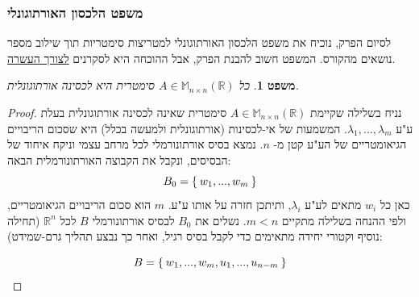 \documentclass[12pt]{report}
\theoremstyle{plain}
\newtheorem{theorem}{משפט}[chapter]
\theoremstyle{definition}
\newcommand{\R}{\mathbb{R}}
\newcommand{\M}{\mathbb{M}}
\newcommand{\0}{\mathbf{0}}
\begin{document}
\subsubsection{משפט הלכסון האורתוגונלי}

לסיום הפרק, נוכיח את משפט הלכסון האורתוגונלי למטריצות סימטריות תוך שילוב מספר נושאים מהקורס. המשפט חשוב להבנת הפרק, אבל ההוכחה היא לסקרנים 
\underline{לצורך העשרה}.

\begin{theorem}\label{thm:symmetric-diag}
כל 
$A\in\M_{n\times n}(\R)$
סימטרית היא לכסינה אורתוגונלית.
\end{theorem}

\begin{proof}
נניח בשלילה שקיימת
$A\in\M_{n\times n}(\R)$
סימטרית שאינה לכסינה אורתוגונלית בעלת ע"ע
$\lambda_1,...,\lambda_m$.
המשמעות של אי-לכסינות (אורתוגונלית ולמעשה בכלל) היא שסכום הריבויים הגיאומטריים של הע"ע
קטן מ-
$n$.
נמצא בסיס אורתונורמלי לכל מרחב עצמי וניקח איחוד של הבסיסים, ונקבל את הקבוצה האורתונורמלית הבאה:
$$
B_0=\Set{w_1,...,w_m}
$$
כאן כל
$w_i$
מתאים לע"ע
$\lambda_i$,
ותיתכן חזרה על אותו ע"ע.
$m$
הוא סכום הריבויים הגיאומטריים, ולפי ההנחה בשלילה מתקיים
$m<n$.
נשלים את
$B_0$
לבסיס אורתונורמלי 
$B$
לכל
$\R^n$
(תחילה נוסיף וקטורי יחידה מתאימים כדי לקבל בסיס רגיל, ואחר כך נבצע תהליך גרם-שמידט):

$$
B=\Set{w_1,...,w_m,u_1,...,u_{n-m}}
$$


\end{proof}
\end{document}
